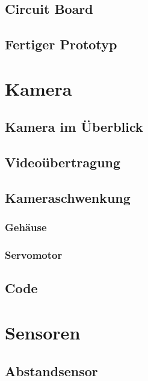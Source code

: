 \documentclass[ngerman,12pt,a4paper]{article}
\begin{document}
		\subsection{Circuit Board} %
		
		\subsection{Fertiger Prototyp} %
	
	\newpage
	\section{Kamera}
	
		\subsection{Kamera im Überblick} %
		

		
		
		
		\subsection{Videoübertragung} %
		
		\subsection{Kameraschwenkung} %
		
			\subsubsection{Gehäuse} %
			
			\subsubsection{Servomotor} %
	
		\subsection{Code} %
		
	\newpage
	\section{Sensoren}
	
		\subsection{Abstandsensor} %
		
\end{document}
